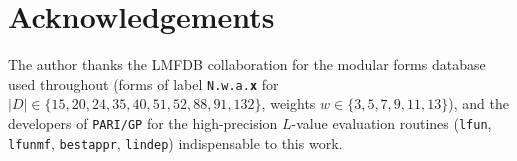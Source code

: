 \documentclass[11pt,a4paper]{amsart}
\theoremstyle{plain}
\theoremstyle{definition}
\newcommand{\absD}{\lvert D\rvert}
\begin{document}
\section*{Acknowledgements}

The author thanks the LMFDB collaboration \cite{LMFDB} for the modular
forms database used throughout (forms of label
\texttt{N.w.a.\textbf{x}} for $\absD \in \{15, 20, 24, 35, 40, 51, 52, 88,
91, 132\}$, weights $w \in \{3, 5, 7, 9, 11, 13\}$), and the developers of
\texttt{PARI/GP} for the high-precision $L$-value evaluation routines
(\texttt{lfun}, \texttt{lfunmf}, \texttt{bestappr}, \texttt{lindep})
indispensable to this work.

\end{document}
